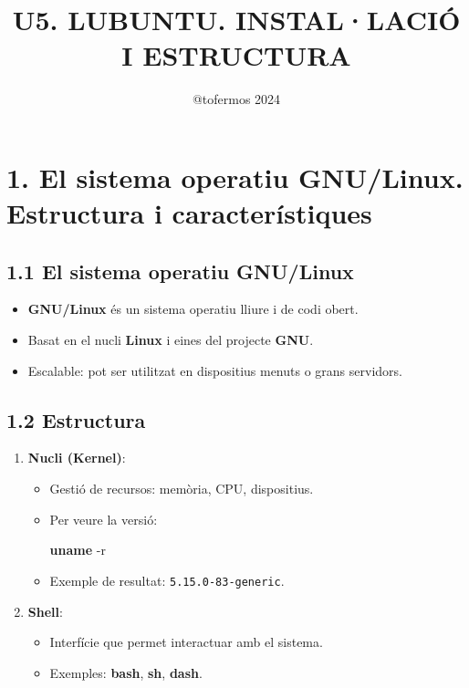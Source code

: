 \documentclass[
  a4paper,
]{article}
\title{U5. LUBUNTU. INSTAL·LACIÓ I ESTRUCTURA}
\author{@tofermos 2024}
\date{}
\newenvironment{Shaded}{\begin{snugshade}}{\end{snugshade}}
\newcommand{\AttributeTok}[1]{\textcolor[rgb]{0.13,0.29,0.53}{#1}}
\newcommand{\FunctionTok}[1]{\textcolor[rgb]{0.13,0.29,0.53}{\textbf{#1}}}
\providecommand{\tightlist}{%
  \setlength{\itemsep}{0pt}\setlength{\parskip}{0pt}}
\begin{document}
\maketitle

{
\setcounter{tocdepth}{2}
\tableofcontents
}
\newpage
\renewcommand\tablename{Tabla}

\section{1. El sistema operatiu GNU/Linux. Estructura i
característiques}\label{el-sistema-operatiu-gnulinux.-estructura-i-caracteruxedstiques}

\subsection{1.1 El sistema operatiu
GNU/Linux}\label{el-sistema-operatiu-gnulinux}

\begin{itemize}
\tightlist
\item
  \textbf{GNU/Linux} és un sistema operatiu lliure i de codi obert.
\item
  Basat en el nucli \textbf{Linux} i eines del projecte \textbf{GNU}.
\item
  Escalable: pot ser utilitzat en dispositius menuts o grans servidors.
\end{itemize}

\subsection{1.2 Estructura}\label{estructura}

\begin{enumerate}
\def\labelenumi{\arabic{enumi}.}
\tightlist
\item
  \textbf{Nucli (Kernel)}:

  \begin{itemize}
  \item
    Gestió de recursos: memòria, CPU, dispositius.
  \item
    Per veure la versió:

\begin{Shaded}
\begin{Highlighting}[]
\FunctionTok{uname} \AttributeTok{{-}r}
\end{Highlighting}
\end{Shaded}
  \item
    Exemple de resultat: \texttt{5.15.0-83-generic}.
  \end{itemize}
\item
  \textbf{Shell}:

  \begin{itemize}
  \tightlist
  \item
    Interfície que permet interactuar amb el sistema.
  \item
    Exemples: \textbf{bash}, \textbf{sh}, \textbf{dash}.
  \end{itemize}
\end{enumerate}
\end{document}
